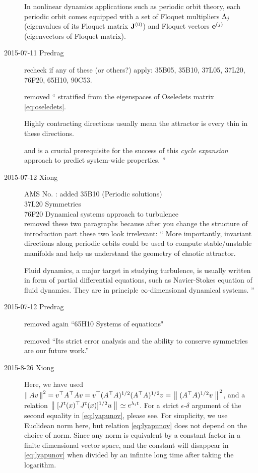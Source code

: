 \begin{description}
In nonlinear dynamics applications such as
periodic orbit theory, each periodic orbit comes equipped
with a set of Floquet multipliers $\ExpaEig_{j}$ (eigenvalues of its
Floquet matrix $\ps{\jMps}{0}$) and Floquet vectors $\jEigvec[j]$
(eigenvectors of Floquet matrix).

\item[2015-07-11 Predrag]
recheck if any of these (or others?) apply:
    35B05, 35B10, 37L05, 37L20, 76F20, 65H10, 90C53.

removed ``
stratified from the eigenspaces of Oseledets matrix \eqref{eq:oseledets}.

Highly contracting directions usually mean the attractor is every thin
in these directions.

and is a crucial prerequisite for the success of this \emph{cycle
expansion} approach to predict system-wide properties.
    ''

\item[2015-07-12 Xiong]
AMS No. : added 35B10 (Periodic solutions)\\
		 37L20 Symmetries \\
		 76F20 Dynamical systems approach to turbulence \\
		
removed these two paragraphs because after you change the
structure of introduction part these two look irrelevant: ``
More importantly, invariant directions along periodic orbits could be
used to compute stable/unstable manifolds and help us understand the
geometry of chaotic attractor.

Fluid dynamics, a major target in
studying turbulence, is usually written in form of
partial differential equations, such as Navier-Stokes equation of fluid
dynamics. They are in principle $\infty$-dimensional dynamical systems.
''

\item[2015-07-12 Predrag] removed again ``65H10 Systems of equations"

 removed ``Its strict error analysis and the ability
to conserve symmetries are our future work.''

\item[2015-8-26 Xiong]
  Here, we have used
  $\norm{Av}^2 = v^\top A^\top Av =
  v^\top (A^\top A)^{1/2}(A^\top A)^{1/2} v
  = \norm{(A^\top A)^{1/2} v}^{2}$, and a relation
  $\norm{[J^t(x)^\top J^t(x)]^{1/2}u}\simeq e^{\Lyap_i t}$. For a strict
  $\epsilon$-$\delta$ argument of the second equality in \eqref{eq:lyapunov},
  please see. For simplicity, we use Euclidean norm here, but
  relation \eqref{eq:lyapunov} does not depend on the choice of norm.
  Since
  any norm is equivalent by a constant factor in a finite dimensional
  vector space, and the constant will disappear in \eqref{eq:lyapunov} when
  divided by an infinite long time after taking the logarithm.


\end{description}
